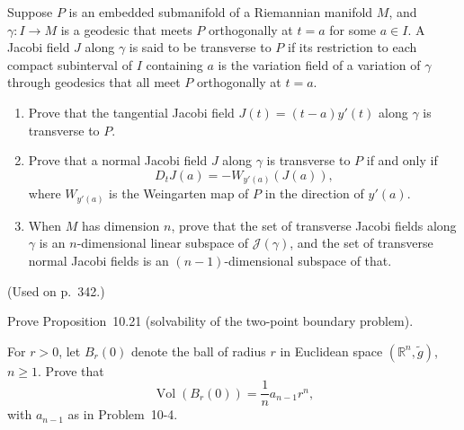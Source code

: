 \begin{exercise}\label{prob:transverse-jacobi-field}
Suppose $P$ is an embedded submanifold of a Riemannian manifold $M$, and $\gamma: I \to M$ is a geodesic that meets $P$ orthogonally at $t = a$ for some $a \in I$. A Jacobi field $J$ along $\gamma$ is said to be transverse to $P$ if its restriction to each compact subinterval of $I$ containing $a$ is the variation field of a variation of $\gamma$ through geodesics that all meet $P$ orthogonally at $t = a$.
\begin{enumerate}
\item[(a)] Prove that the tangential Jacobi field $J(t) = (t - a)y'(t)$ along $\gamma$ is transverse to $P$.
\item[(b)] Prove that a normal Jacobi field $J$ along $\gamma$ is transverse to $P$ if and only if
\[
D_t J(a) = -W_{y'(a)}(J(a)),
\]
where $W_{y'(a)}$ is the Weingarten map of $P$ in the direction of $y'(a)$.
\item[(c)] When $M$ has dimension $n$, prove that the set of transverse Jacobi fields along $\gamma$ is an $n$-dimensional linear subspace of $\mathcal{J}(\gamma)$, and the set of transverse normal Jacobi fields is an $(n-1)$-dimensional subspace of that.
\end{enumerate}

(Used on p.\ 342.)
\end{exercise}

\begin{exercise}
\label{prob:two-point-boundary-problem}

Prove Proposition~10.21 (solvability of the two-point boundary problem).
\end{exercise}

\begin{exercise}
\label{prob:volume-euclidean-balls}

For $r > 0$, let $B_r(0)$ denote the ball of radius $r$ in Euclidean space $(\mathbb{R}^n, \tilde{g})$, $n \geq 1$. Prove that
\[
\operatorname{Vol}(B_r(0)) = \frac{1}{n} a_{n-1} r^n,
\]
with $a_{n-1}$ as in Problem~10-4.
\end{exercise}

